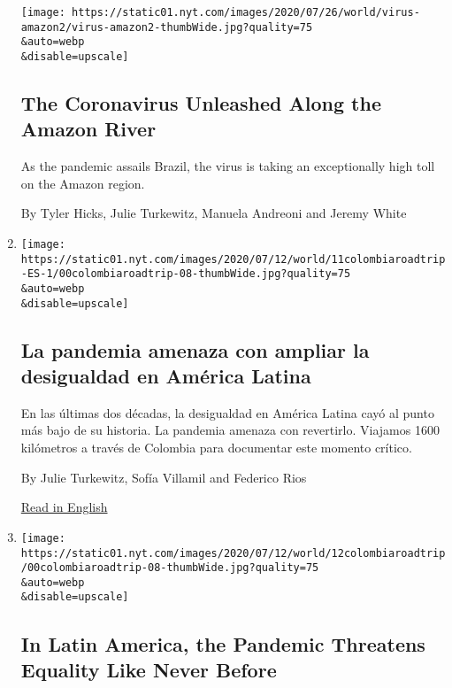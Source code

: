 \begin{enumerate}
  \texttt{[image: https://static01.nyt.com/images/2020/07/26/world/virus-amazon2/virus-amazon2-thumbWide.jpg?quality=75\\\&auto=webp\\\&disable=upscale]}

  \hypertarget{the-coronavirus-unleashed-along-the-amazon-river}{%
  \subsection{The Coronavirus Unleashed Along the Amazon
  River}\label{the-coronavirus-unleashed-along-the-amazon-river}}

  As the pandemic assails Brazil, the virus is taking an exceptionally
  high toll on the Amazon region.

  By Tyler Hicks, Julie Turkewitz, Manuela Andreoni and Jeremy White
\item
  \href{/es/2020/07/11/espanol/america-latina/desigualdad-coronavirus-america-latina-colombia.html}{}

  \texttt{[image: https://static01.nyt.com/images/2020/07/12/world/11colombiaroadtrip-ES-1/00colombiaroadtrip-08-thumbWide.jpg?quality=75\\\&auto=webp\\\&disable=upscale]}

  \hypertarget{la-pandemia-amenaza-con-ampliar-la-desigualdad-en-amuxe9rica-latina}{%
  \subsection{La pandemia amenaza con ampliar la desigualdad en América
  Latina}\label{la-pandemia-amenaza-con-ampliar-la-desigualdad-en-amuxe9rica-latina}}

  En las últimas dos décadas, la desigualdad en América Latina cayó al
  punto más bajo de su historia. La pandemia amenaza con revertirlo.
  Viajamos 1600 kilómetros a través de Colombia para documentar este
  momento crítico.

  By Julie Turkewitz, Sofía Villamil and Federico Rios

  \href{https://www.nytimes.com/2020/07/11/world/americas/coronavirus-latin-america-inequality.html}{Read
  in English}
\item
  \href{/2020/07/11/world/americas/coronavirus-latin-america-inequality.html}{}

  \texttt{[image: https://static01.nyt.com/images/2020/07/12/world/12colombiaroadtrip/00colombiaroadtrip-08-thumbWide.jpg?quality=75\\\&auto=webp\\\&disable=upscale]}

  \hypertarget{in-latin-america-the-pandemic-threatens-equality-like-never-before}{%
  \subsection{In Latin America, the Pandemic Threatens Equality Like
  Never
  Before}\label{in-latin-america-the-pandemic-threatens-equality-like-never-before}}


\end{enumerate}
